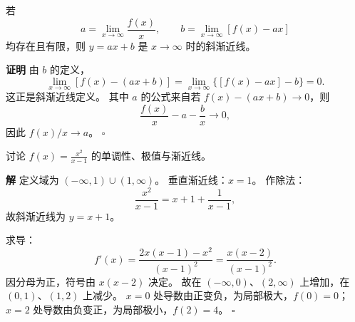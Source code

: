 \documentclass[fontset=fandol]{ctexart}
\newenvironment{proofdetail}{\par\noindent\textbf{证明}\quad}{\hfill$\square$\par\vspace{0.8em}}
\newenvironment{solution}{\par\noindent\textbf{解}\quad}{\hfill$\square$\par\vspace{0.8em}}
\begin{document}
\begin{proposition}[斜渐近线求法]
若
\[
a=\lim_{x\to\infty}\frac{f(x)}{x},\qquad
b=\lim_{x\to\infty}[f(x)-ax]
\]
均存在且有限，则 $y=ax+b$ 是 $x\to\infty$ 时的斜渐近线。
\end{proposition}
\begin{proofdetail}
由 $b$ 的定义，
\[
\lim_{x\to\infty}[f(x)-(ax+b)]
=\lim_{x\to\infty}\{[f(x)-ax]-b\}=0.
\]
这正是斜渐近线定义。 其中 $a$ 的公式来自若 $f(x)-(ax+b)\to0$，则
\[
\frac{f(x)}x-a-\frac bx\to0,
\]
因此 $f(x)/x\to a$。
\end{proofdetail}

\begin{example}[完整图像分析]
讨论 $f(x)=\frac{x^2}{x-1}$ 的单调性、极值与渐近线。
\end{example}
\begin{solution}
定义域为 $(-\infty,1)\cup(1,\infty)$。 垂直渐近线：$x=1$。
作除法：
\[
\frac{x^2}{x-1}=x+1+\frac1{x-1},
\]
故斜渐近线为 $y=x+1$。

求导：
\[
f'(x)=\frac{2x(x-1)-x^2}{(x-1)^2}=\frac{x(x-2)}{(x-1)^2}.
\]
因分母为正，符号由 $x(x-2)$ 决定。 故在 $(-\infty,0)$、$(2,\infty)$ 上增加，在 $(0,1)$、$(1,2)$ 上减少。 $x=0$ 处导数由正变负，为局部极大，$f(0)=0$；$x=2$ 处导数由负变正，为局部极小，$f(2)=4$。
\end{solution}

\begin{center}
\end{center}
\end{document}
